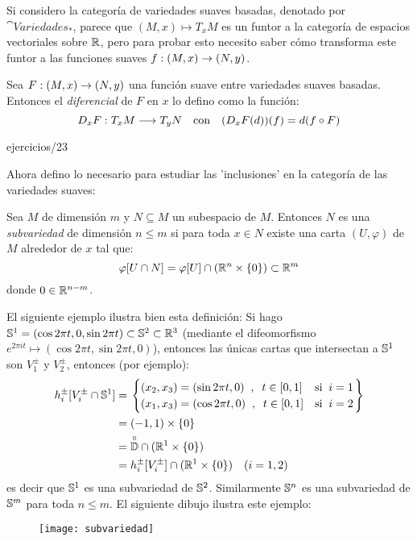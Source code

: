 \documentclass[../../topologia_algebraica]{subfiles}
\begin{document}
Si considero la categor\'ia de variedades suaves basadas, denotado por $\cat{Variedades}_*$,
parece que $(M,x)\mapsto T_x M$ es un funtor a la categor\'ia de espacios vectoriales sobre $\mathbb{R}$,
pero para probar esto necesito saber c\'omo transforma este funtor a las funciones suaves
$f:(M,x)\rightarrow(N,y)$.

\begin{defin}
  Sea $F:(M,x)\rightarrow (N,y)$ una funci\'on suave entre variedades suaves basadas. Entonces el
  \emph{diferencial} de $F$ en $x$ lo defino como la funci\'on:
  \[
    D_xF:T_x M \longrightarrow T_{y}N \quad\text{con}\quad (D_xF(d))(f)=d(f\circ F)
  \]
\end{defin}

{ejercicios/23} %

Ahora defino lo necesario para estudiar las 'inclusiones' en la categor\'ia de las variedades
suaves:

\begin{defin}
  Sea $M$ de dimensi\'on $m$ y $N\subseteq M$ un subespacio de $M$. Entonces $N$ es una
  \emph{subvariedad} de dimensi\'on $n\leq m$ si para toda $x\in N$ existe una carta $(U,\varphi)$
  de $M$ alrededor de $x$ tal que:
  \[
    \varphi[U\cap N]=\varphi[U]\cap(\mathbb{R}^n\times\{0\})\subset \mathbb{R}^m
  \]
  donde $0\in\mathbb{R}^{n-m}$.
\end{defin}

El siguiente ejemplo ilustra bien esta definici\'on:
  Si hago $\mathbb{S}^1=(\cos 2\pi t,0,\sin 2\pi t)\subset\mathbb{S}^2\subset\mathbb{R}^3$ (mediante el difeomorfismo
  $e^{2\pi i t}\mapsto(\cos 2\pi t,\sin 2\pi t,0)$), entonces las \'unicas cartas que intersectan
  a $\mathbb{S}^1$ son $V_1^{\pm}$ y $V_2^{\pm}$, entonces (por ejemplo):
\begin{align*}
  h_i^{\pm}[V_i^{\pm}\cap \mathbb{S}^1]& =\left.
  \begin{cases}
      (x_2,x_3)=(\sin 2\pi t,0)\;\; , \;\; t\in[0,1] & \text{si}\;\; i=1 \\
      (x_1,x_3)=(\cos 2\pi t,0)\;\; , \;\; t\in[0,1] & \text{si}\;\; i=2
  \end{cases}\right\} \\ & =
  (-1,1)\times\{0\} \\ & =
  \overset{\circ}{\mathbb{D}}\cap (\mathbb{R}^1\times\{0\}) \\ & =
  h_i^{\pm}[V_i^{\pm}]\cap (\mathbb{R}^1\times\{0\}) \quad(i=1,2)
\end{align*}
es decir que $\mathbb{S}^1$ es una subvariedad de $\mathbb{S}^2$. Similarmente $\mathbb{S}^n$ es una subvariedad
de $\mathbb{S}^m$ para toda $n\leq m$. El siguiente dibujo ilustra este ejemplo:
  \begin{figure}[ht]%
    \centering
    \texttt{[image: subvariedad]}
  \end{figure}%
\end{document}
